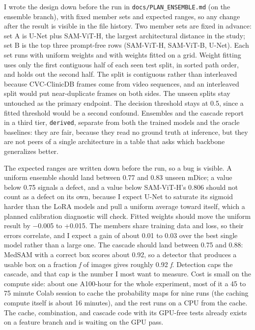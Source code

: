 \documentclass[conference]{IEEEtran}
\begin{document}
I wrote the design down before the run in \texttt{docs/PLAN\_ENSEMBLE.md} (on the ensemble branch), with fixed member sets and expected ranges, so any change after the result is visible in the file history. Two member sets are fixed in advance: set A is U-Net plus SAM-ViT-H, the largest architectural distance in the study; set B is the top three prompt-free rows (SAM-ViT-H, SAM-ViT-B, U-Net). Each set runs with uniform weights and with weights fitted on a grid. Weight fitting uses only the first contiguous half of each seen test split, in sorted path order, and holds out the second half. The split is contiguous rather than interleaved because CVC-ClinicDB frames come from video sequences, and an interleaved split would put near-duplicate frames on both sides. The unseen splits stay untouched as the primary endpoint. The decision threshold stays at 0.5, since a fitted threshold would be a second confound. Ensembles and the cascade report in a third tier, \texttt{derived}, separate from both the trained models and the oracle baselines: they are fair, because they read no ground truth at inference, but they are not peers of a single architecture in a table that asks which backbone generalizes better.

The expected ranges are written down before the run, so a bug is visible. A uniform ensemble should land between 0.77 and 0.83 unseen mDice; a value below 0.75 signals a defect, and a value below SAM-ViT-H's 0.806 should not count as a defect on its own, because I expect U-Net to saturate its sigmoid harder than the LoRA models and pull a uniform average toward itself, which a planned calibration diagnostic will check. Fitted weights should move the uniform result by $-$0.005 to +0.015. The members share training data and loss, so their errors correlate, and I expect a gain of about 0.01 to 0.03 over the best single model rather than a large one. The cascade should land between 0.75 and 0.88: MedSAM with a correct box scores about 0.92, so a detector that produces a usable box on a fraction \textit{f} of images gives roughly 0.92 \textit{f}. Detection caps the cascade, and that cap is the number I most want to measure. Cost is small on the compute side: about one A100-hour for the whole experiment, most of it a 45 to 75 minute Colab session to cache the probability maps for nine runs (the caching compute itself is about 16 minutes), and the rest runs on a CPU from the cache. The cache, combination, and cascade code with its GPU-free tests already exists on a feature branch and is waiting on the GPU pass.
\end{document}
